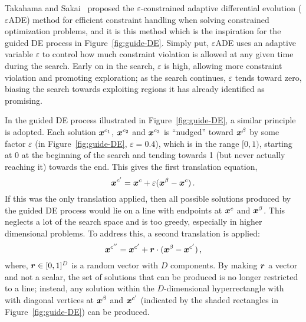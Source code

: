 Takahama and Sakai~\cite{takahama2010efficient} proposed the $\varepsilon$-constrained adaptive differential evolution ($\varepsilon$ADE) method for efficient constraint handling when solving constrained optimization problems, and it is this method which is the inspiration for the guided DE process in Figure~\ref{fig:guide-DE}. Simply put, $\varepsilon$ADE uses an adaptive variable $\varepsilon$ to control how much constraint violation is allowed at any given time during the search. Early on in the search, $\varepsilon$ is high, allowing more constraint violation and promoting exploration; as the search continues, $\varepsilon$ tends toward zero, biasing the search towards exploiting regions it has already identified as promising.

In the guided DE process illustrated in Figure~\ref{fig:guide-DE}, a similar principle is adopted. Each solution $\boldsymbol{x}^{c_1}$, $\boldsymbol{x}^{c_2}$ and $\boldsymbol{x}^{c_3}$ is ``nudged'' toward $\boldsymbol{x}^\beta$ by some factor $\varepsilon$ (in Figure~\ref{fig:guide-DE}, $\varepsilon=0.4$), which is in the range $[0,1)$, starting at 0 at the beginning of the search and tending towards 1 (but never actually reaching it) towards the end. This gives the first translation equation,
\begin{equation}\label{eq:nudge1}
\boldsymbol{x}^{c'} = \boldsymbol{x}^c + \varepsilon(\boldsymbol{x}^\beta - \boldsymbol{x}^c)\,.
\end{equation}
If this was the only translation applied, then all possible solutions produced by the guided DE process would lie on a line with endpoints at $\boldsymbol{x}^{c}$ and $\boldsymbol{x}^\beta$. This neglects a lot of the search space and is too greedy, especially in higher dimensional problems. To address this, a second translation is applied:
\begin{equation}\label{eq:nudge2}
\boldsymbol{x}^{c''} = \boldsymbol{x}^{c'} + \boldsymbol{r} \cdot (\boldsymbol{x}^\beta - \boldsymbol{x}^{c'})\,,
\end{equation}
where, $\boldsymbol{r}\in [0,1]^D$ is a random vector with $D$ components. By making $\boldsymbol{r}$ a vector and not a scalar, the set of solutions that can be produced is no longer restricted to a line; instead, any solution within the $D$-dimensional hyperrectangle with with diagonal vertices at $\boldsymbol{x}^\beta$ and $\boldsymbol{x}^{c'}$ (indicated by the shaded rectangles in Figure~\ref{fig:guide-DE}) can be produced.

